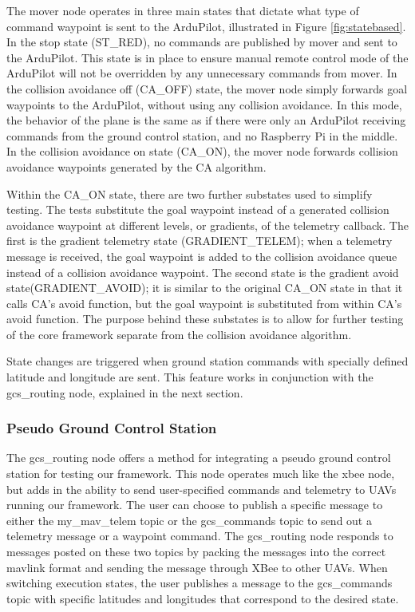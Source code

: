 \documentclass[conference]{IEEEtran}
\begin{document}
The mover node operates in three main states that dictate what type of command waypoint is sent to the ArduPilot, illustrated in Figure \ref{fig:statebased}. 
In the stop state (ST\_RED), no commands are published by mover and sent to the ArduPilot. This state is in place to ensure manual remote control mode of the ArduPilot will not be overridden by any unnecessary commands from mover.
In the collision avoidance off (CA\_OFF) state, the mover node simply forwards goal waypoints to the ArduPilot, without using any collision avoidance. In this mode, the behavior of the plane is the same as if there were only an ArduPilot receiving commands from the ground control station, and no Raspberry Pi in the middle. In the collision avoidance on state (CA\_ON), the mover node forwards collision avoidance waypoints generated by the CA algorithm. 

Within the CA\_ON state, there are two further substates used to simplify testing. The tests substitute the goal waypoint instead of a generated collision avoidance waypoint at different levels, or gradients, of the telemetry callback. The first is the gradient telemetry state (GRADIENT\_TELEM); when a telemetry message is received, the goal waypoint is added to the collision avoidance queue instead of a collision avoidance waypoint. The second state is the gradient avoid state(GRADIENT\_AVOID); it is similar to the original CA\_ON state in that it calls CA's avoid function, but the goal waypoint is substituted from within CA's avoid function. The purpose behind these substates is to allow for further testing of the core framework separate from the collision avoidance algorithm.

State changes are triggered when ground station commands with specially defined latitude and longitude are sent. This feature works in conjunction with the gcs\_routing node, explained in the next section.


\subsubsection{Pseudo Ground Control Station}

The gcs\_routing node offers a method for integrating a pseudo ground control station for testing our framework.  This node operates much like the xbee node, but adds in the ability to send user-specified commands and telemetry to UAVs running our framework.  The user can choose to publish a specific message to either the my\_mav\_telem topic or the gcs\_commands topic to send out a telemetry message or a waypoint command.  The gcs\_routing node responds to messages posted on these two topics by packing the messages into the correct mavlink format and sending the message through XBee to other UAVs.  When switching execution states, the user publishes a message to the gcs\_commands topic with specific latitudes and longitudes that correspond to the desired state.  
\end{document}
